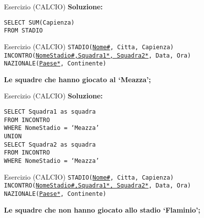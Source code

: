 \begin{frame}{Esercizio (CALCIO)}
    \textbf{Soluzione:}
    \vspace{1em}
    
    \texttt{SELECT SUM(Capienza)\\FROM STADIO}
\end{frame}
\begin{frame}{Esercizio (CALCIO) } 
    \texttt{STADIO(\underline{Nome\#}, Citta, Capienza)\\
    INCONTRO(\underline{NomeStadio\#,Squadra1*, Squadra2*}, Data, Ora)\\
    NAZIONALE(\underline{Paese*}, Continente)}
    \vspace{1em}
    
    \textbf{Le squadre che hanno giocato al `Meazza';}
\end{frame}

\begin{frame}{Esercizio (CALCIO)}
    \textbf{Soluzione:}
    \vspace{1em}
    
    \texttt{SELECT Squadra1 as squadra\\FROM INCONTRO\\WHERE NomeStadio = `Meazza'
\\UNION\\SELECT Squadra2 as squadra\\FROM INCONTRO\\WHERE NomeStadio = `Meazza'}
\end{frame}
\begin{frame}{Esercizio (CALCIO) } 
    \texttt{STADIO(\underline{Nome\#}, Citta, Capienza)\\
    INCONTRO(\underline{NomeStadio\#,Squadra1*, Squadra2*}, Data, Ora)\\
    NAZIONALE(\underline{Paese*}, Continente)}
    \vspace{1em}
    
    \textbf{Le squadre che non hanno giocato allo stadio `Flaminio';}
\end{frame}

